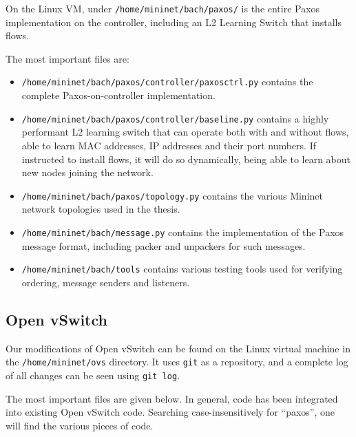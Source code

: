 On the Linux VM, under \texttt{/home/mininet/bach/paxos/} is the entire
Paxos implementation on the controller, including an L2 Learning Switch that
installs flows.

The most important files are:

\begin{itemize}
  \item \texttt{/home/mininet/bach/paxos/controller/paxosctrl.py}
  contains the complete Paxos-on-controller implementation.

  \item \texttt{/home/mininet/bach/paxos/controller/baseline.py} contains a
  highly performant L2 learning switch that can operate both with and
  without flows, able to learn MAC addresses, IP addresses and their port
  numbers.  If instructed to install flows, it will do so dynamically, being
  able to learn about new nodes joining the network.

  \item \texttt{/home/mininet/bach/paxos/topology.py} contains the various
  Mininet network topologies used in the thesis.

  \item \texttt{/home/mininet/bach/message.py} contains the implementation
  of the Paxos message format, including packer and unpackers for such
  messages.

  \item \texttt{/home/mininet/bach/tools} contains various testing tools
  used for verifying ordering, message senders and listeners.


\end{itemize}


\subsection{Open vSwitch}
\label{chapter:compiling.ovs}

Our modifications of Open vSwitch can be found on the Linux virtual machine
in the \texttt{/home/mininet/ovs} directory.  It uses \texttt{git} as a
repository, and a complete log of all changes can be seen using \texttt{git log}.

The most important files are given below.  In general, code has been
integrated into existing Open vSwitch code.  Searching case-insensitively
for ``paxos'', one will find the various pieces of code.

